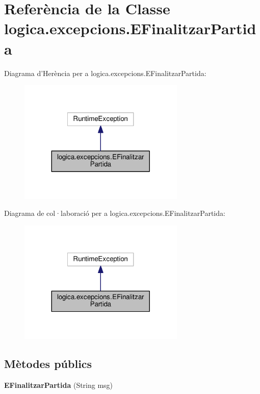 \hypertarget{classlogica_1_1excepcions_1_1_e_finalitzar_partida}{\section{Referència de la Classe logica.\+excepcions.\+E\+Finalitzar\+Partida}
\label{classlogica_1_1excepcions_1_1_e_finalitzar_partida}
}


Diagrama d'Herència per a logica.\+excepcions.\+E\+Finalitzar\+Partida\+:\nopagebreak
\begin{figure}[H]
\begin{center}
\leavevmode
\includegraphics[width=224pt]{classlogica_1_1excepcions_1_1_e_finalitzar_partida__inherit__graph}
\end{center}
\end{figure}


Diagrama de col·laboració per a logica.\+excepcions.\+E\+Finalitzar\+Partida\+:\nopagebreak
\begin{figure}[H]
\begin{center}
\leavevmode
\includegraphics[width=224pt]{classlogica_1_1excepcions_1_1_e_finalitzar_partida__coll__graph}
\end{center}
\end{figure}
\subsection*{Mètodes públics}
\begin{DoxyCompactItemize}
\item 
\hypertarget{classlogica_1_1excepcions_1_1_e_finalitzar_partida_a856addcb2d075269c62b9584e06b74b4}{{\bfseries E\+Finalitzar\+Partida} (String msg)}\label{classlogica_1_1excepcions_1_1_e_finalitzar_partida_a856addcb2d075269c62b9584e06b74b4}

\end{DoxyCompactItemize}


